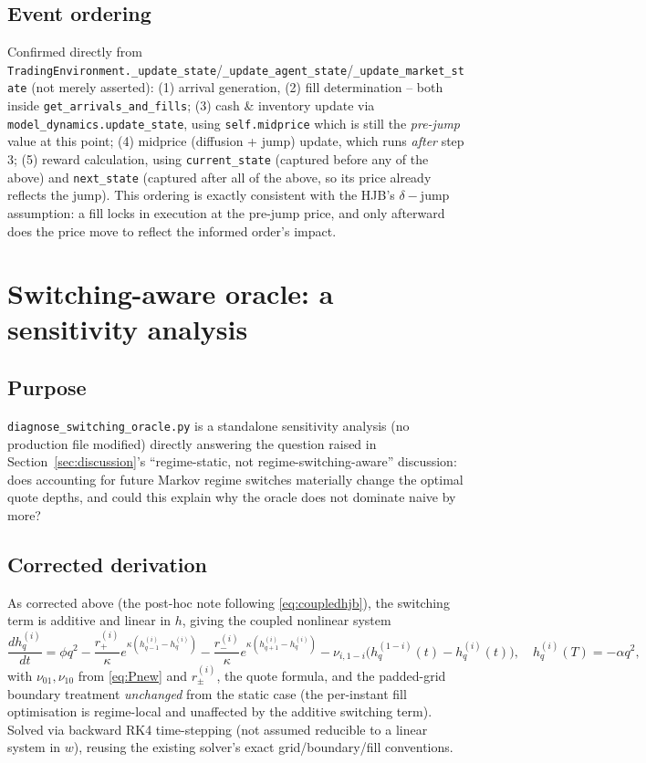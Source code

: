 \documentclass[11pt]{article}
\begin{document}
\subsection{Event ordering}
Confirmed directly from \texttt{TradingEnvironment.\_update\_state}/\texttt{\_update\_agent\_state}/\texttt{\_update\_market\_state} (not merely asserted): (1) arrival generation, (2) fill determination -- both inside \texttt{get\_arrivals\_and\_fills}; (3) cash \& inventory update via \texttt{model\_dynamics.update\_state}, using \texttt{self.midprice} which is still the \emph{pre-jump} value at this point; (4) midprice (diffusion + jump) update, which runs \emph{after} step 3; (5) reward calculation, using \texttt{current\_state} (captured before any of the above) and \texttt{next\_state} (captured after all of the above, so its price already reflects the jump). This ordering is exactly consistent with the HJB's $\delta-\text{jump}$ assumption: a fill locks in execution at the pre-jump price, and only afterward does the price move to reflect the informed order's impact.

\section{Switching-aware oracle: a sensitivity analysis}
\label{sec:switchingaware}

\subsection{Purpose}
\texttt{diagnose\_switching\_oracle.py} is a standalone sensitivity analysis (no production file modified) directly answering the question raised in Section~\ref{sec:discussion}'s ``regime-static, not regime-switching-aware'' discussion: does accounting for future Markov regime switches materially change the optimal quote depths, and could this explain why the oracle does not dominate naive by more?

\subsection{Corrected derivation}
As corrected above (the post-hoc note following \eqref{eq:coupledhjb}), the switching term is additive and linear in $h$, giving the coupled nonlinear system
\begin{equation}
\frac{dh_q^{(i)}}{dt} = \phi q^2 - \frac{r_+^{(i)}}{\kappa}e^{\kappa(h_{q-1}^{(i)}-h_q^{(i)})} - \frac{r_-^{(i)}}{\kappa}e^{\kappa(h_{q+1}^{(i)}-h_q^{(i)})} - \nu_{i,1-i}\big(h_q^{(1-i)}(t) - h_q^{(i)}(t)\big), \quad h_q^{(i)}(T)=-\alpha q^2,
\label{eq:switchinghjb}
\end{equation}
with $\nu_{01},\nu_{10}$ from \eqref{eq:Pnew} and $r_\pm^{(i)}$, the quote formula, and the padded-grid boundary treatment \emph{unchanged} from the static case (the per-instant fill optimisation is regime-local and unaffected by the additive switching term). Solved via backward RK4 time-stepping (not assumed reducible to a linear system in $w$), reusing the existing solver's exact grid/boundary/fill conventions.
\end{document}
